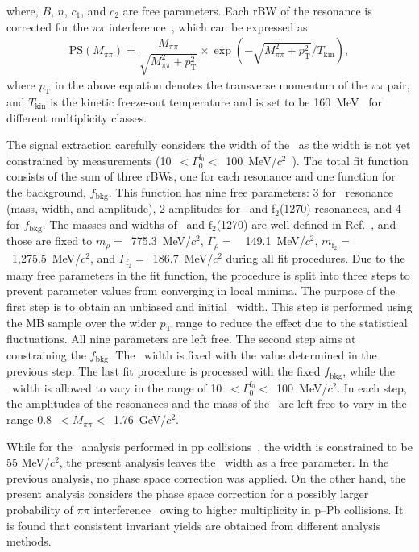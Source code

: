 where, $B$, $n$, $c_{1}$, and $c_{2}$ are free parameters. Each rBW of the resonance is corrected for the $\pi\pi$ interference~\cite{ALICE:2018qdv}, which can be expressed as
\begin{eqnarray}
\mathrm{PS}(M_{\pi\pi}) = \dfrac{M_{\pi\pi}}{\sqrt{M_{\pi\pi}^{2}+p_{\mathrm{T}}^{2}}}\times\exp{(-\sqrt{M_{\pi\pi}^{2}+p_{\mathrm{T}}^{2}}/T_{\mathrm{kin}})},
\label{eq:ps}
\end{eqnarray} 
where $p_{\mathrm{T}}$ in the above equation denotes the transverse momentum of the $\pi\pi$ pair, and $T_{\mathrm{kin}}$ is the kinetic freeze-out temperature and is set to be 160~MeV~\cite{ALICE:2018qdv} for different multiplicity classes.

The signal extraction carefully considers the width of the \fzero~as the width is not yet constrained by measurements (10~$<\Gamma_{0}^{\mathrm{f}_{0}}<$~100~MeV/$c^{2}$~\cite{ParticleDataGroup:2022pth}). The total fit function consists of the sum of three rBWs, one for each resonance and one function for the background, $f_{\mathrm{bkg}}$. This function has nine free parameters: 3 for \fzero~resonance (mass, width, and amplitude), 2 amplitudes for \rhoz~and f$_{2}$(1270) resonances, and 4 for $f_{\mathrm{bkg}}$. The masses and widths of \rhoz~and $\mathrm{f}_{2}$(1270) are well defined in Ref.~\cite{ParticleDataGroup:2022pth}, and those are fixed to $m_{\rho}=$~775.3~MeV/$c^{2}$, $\Gamma_{\rho}=$~~149.1~MeV/$c^{2}$, $m_{\mathrm{f}_{2}}=$~1,275.5~MeV/$c^{2}$, and $\Gamma_{\mathrm{f}_{2}}=$~186.7~MeV/$c^{2}$ during all fit procedures. Due to the many free parameters in the fit function, the procedure is split into three steps to prevent parameter values from converging in local minima. The purpose of the first step is to obtain an unbiased and initial \fzero~width. This step is performed using the MB sample over the wider $p_{\mathrm{T}}$ range to reduce the effect due to the statistical fluctuations. All nine parameters are left free. The second step aims at constraining the $f_{\mathrm{bkg}}$. The \fzero~width is fixed with the value determined in the previous step. The last fit procedure is processed with the fixed $f_{\mathrm{bkg}}$, while the \fzero~width is allowed to vary in the range of 10~$<\Gamma_{0}^{\mathrm{f}_{0}}<$~100~MeV/$c^{2}$. In each step, the amplitudes of the resonances and the mass of the \fzero~are left free to vary in the range  0.8~$<M_{\pi\pi}<$~1.76~GeV/$c^{2}$.

While for the \fzero~analysis performed in pp collisions~\cite{ALICE:2022qnb}, the width is constrained to be 55 MeV/$c^{2}$, the present analysis leaves the \fzero~width as a free parameter. In the previous analysis, no phase space correction was applied. On the other hand, the present analysis considers the phase space correction for a possibly larger probability of $\pi\pi$ interference~\cite{STAR:2003vqj} owing to higher multiplicity in p--Pb collisions. It is found that consistent invariant yields are obtained from different analysis methods.

